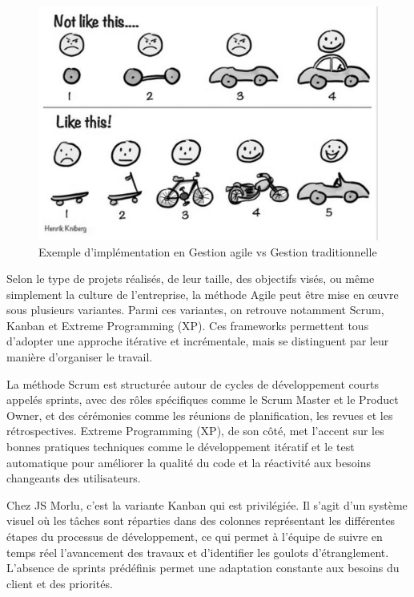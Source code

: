 \vspace{0.35cm}
\begin{figure}[H]
\begin{center}
\includegraphics[width=15cm]{assets/presentation/3_mvp.png}
\end{center}
\caption{Exemple d'implémentation en Gestion agile vs Gestion traditionnelle}
\end{figure}

\vspace{0.35cm}

Selon le type de projets réalisés, de leur taille, des objectifs visés, ou même simplement la culture de l'entreprise, la méthode Agile peut être mise en œuvre sous plusieurs variantes. Parmi ces variantes, on retrouve notamment Scrum, Kanban et Extreme Programming (XP). Ces frameworks permettent tous d'adopter une approche itérative et incrémentale, mais se distinguent par leur manière d'organiser le travail.

\vspace{0.3cm}

La méthode Scrum est structurée autour de cycles de développement courts appelés sprints, avec des rôles spécifiques comme le Scrum Master et le Product Owner, et des cérémonies comme les réunions de planification, les revues et les rétrospectives. Extreme Programming (XP), de son côté, met l’accent sur les bonnes pratiques techniques comme le développement itératif et le test automatique pour améliorer la qualité du code et la réactivité aux besoins changeants des utilisateurs.

\vspace{0.3cm}

Chez JS Morlu, c'est la variante Kanban qui est privilégiée. Il s'agit d'un système visuel où les tâches sont réparties dans des colonnes représentant les différentes étapes du processus de développement, ce qui permet à l'équipe de suivre en temps réel l'avancement des travaux et d'identifier les goulots d'étranglement. L'absence de sprints prédéfinis permet une adaptation constante aux besoins du client et des priorités.

